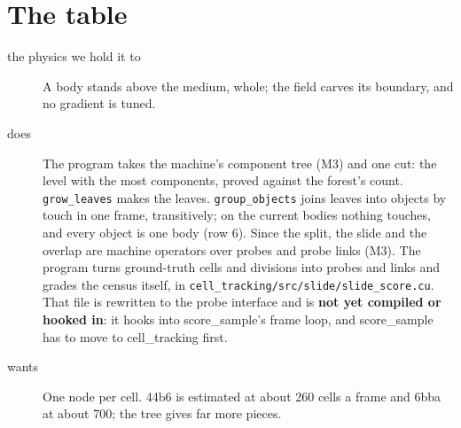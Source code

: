 \section{\texorpdfstring{The table}{The table}}

\begin{description}
\item[{the physics we hold it to}] A body stands above the medium, whole; the field carves its boundary, and no gradient is tuned.
\item[{does}] The program takes the machine's component tree (M3) and one cut: the level with the most components, proved against the forest's count. \texttt{grow\_\allowbreak{}leaves} makes the leaves. \texttt{group\_\allowbreak{}objects} joins leaves into objects by touch in one frame, transitively; on the current bodies nothing touches, and every object is one body (row 6). Since the split, the slide and the overlap are machine operators over probes and probe links (M3). The program turns ground-truth cells and divisions into probes and links and grades the census itself, in \texttt{cell\_\allowbreak{}tracking/\allowbreak{}src/\allowbreak{}slide/\allowbreak{}slide\_\allowbreak{}score.\allowbreak{}cu}. That file is rewritten to the probe interface and is \textbf{not yet compiled or hooked in}: it hooks into score\_\allowbreak{}sample's frame loop, and score\_\allowbreak{}sample has to move to cell\_\allowbreak{}tracking first.
\item[{wants}] One node per cell. 44b6 is estimated at about 260 cells a frame and 6bba at about 700; the tree gives far more pieces.

\end{description}
